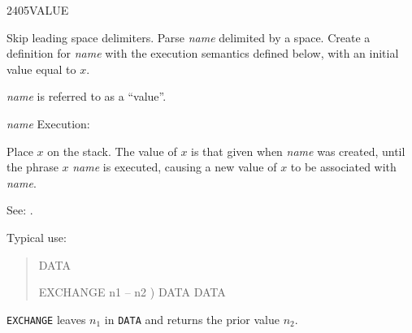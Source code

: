 \begin{newword}{2405}{VALUE}

	Skip leading space delimiters. Parse \emph{name} delimited by
	a space. Create a definition for \emph{name} with the execution
	semantics defined below, with an initial value equal to $x$.

	\emph{name} is referred to as a ``value''.

\item[\emph{name} Execution:]

	Place $x$ on the stack. The value of $x$ is that given when
	\emph{name} was created, until the phrase $x$ 
	\emph{name} is executed, causing a new value of $x$ to be
	associated with \emph{name}.

\item[See:]
	.

	\begin{rationale} %
		Typical use:
		\begin{quote}  DATA

			\word{:} EXCHANGE  n1 -- n2 )
				DATA   DATA
			\word{;}
		\end{quote}
		\texttt{EXCHANGE} leaves $n_1$ in \texttt{DATA} and returns the
		prior value $n_2$.
	\end{rationale}
\end{newword}


